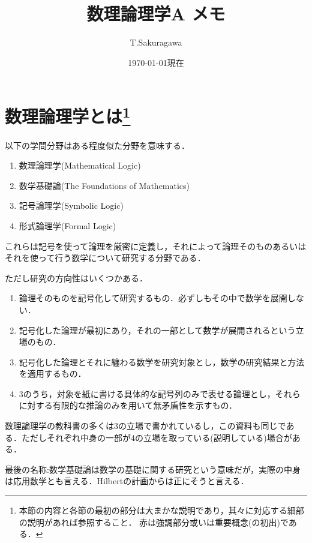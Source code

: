 \documentclass{ltjsarticle}
\theoremstyle{mystyle1}
\theoremstyle{mystyle2}
\newcommand{\red}[1]{{\color{red} #1}}
\begin{document}
\title{数理論理学A メモ}
\author{T.Sakuragawa}
\date{\today 現在}
\maketitle

\setcounter{section}{-1}
\section{数理論理学とは\footnote{本節の内容と各節の最初の部分は大まかな説明であり，其々に対応する細部の説明があれば参照すること． \red{赤}は強調部分或いは重要概念(の初出)である．}}
以下の学問分野はある程度似た分野を意味する．
\begin{enumerate}
  \item 数理論理学(Mathematical Logic)
  \item 数学基礎論(The Foundations of Mathematics)
  \item 記号論理学(Symbolic Logic)
  \item 形式論理学(Formal Logic)
\end{enumerate}
これらは記号を使って論理を厳密に定義し，それによって論理そのものあるいはそれを使って行う数学について研究する分野である．

ただし研究の方向性はいくつかある．
\begin{enumerate}
  \item 論理そのものを記号化して研究するもの．必ずしもその中で数学を展開しない．
  \item 記号化した論理が最初にあり，それの一部として数学が展開されるという立場のもの．
  \item 記号化した論理とそれに纏わる数学を研究対象とし，数学の研究結果と方法を適用するもの．
  \item 3のうち，対象を紙に書ける具体的な記号列のみで表せる論理とし，それらに対する有限的な推論のみを用いて無矛盾性を示すもの．
\end{enumerate}
数理論理学の教科書の多くは3の立場で書かれているし，この資料も同じである．ただしそれぞれ中身の一部が4の立場を取っている(説明している)場合がある．

最後の名称:数学基礎論は数学の基礎に関する研究という意味だが，実際の中身は応用数学とも言える．Hilbertの計画からは正にそうと言える．
\end{document}
